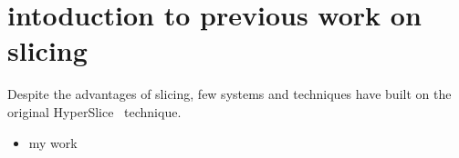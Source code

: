 \section{intoduction to previous work on slicing}
\label{intoduction-to-previous-work-on-slicing}

Despite the advantages of slicing, few systems and techniques have built on
the original HyperSlice~\cite{Wijk:1993} technique.

\begin{itemize}
\tightlist
\item
  my work
\end{itemize}

